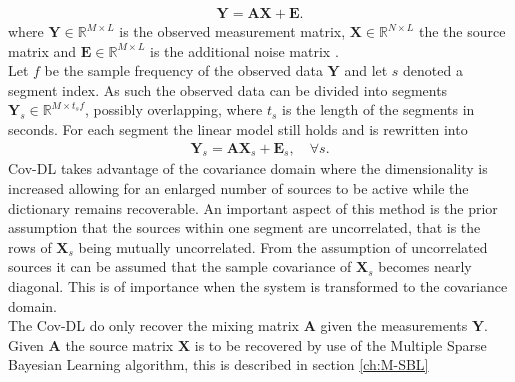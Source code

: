 \begin{align*}
\mathbf{Y} = \mathbf{AX}+\textbf{E}.
\end{align*}
where $\mathbf{Y} \in \mathbb{R}^{M \times L}$ is the observed  measurement matrix, $\mathbf{X} \in \mathbb{R}^{N \times L}$ the the source matrix and $\mathbf{E} \in \mathbb{R}^{M \times L}$ is the additional noise matrix .
\\
Let $f$ be the sample frequency of the observed data $\mathbf{Y}$ and let $s$ denoted a segment index. As such the observed data can be divided into segments $\mathbf{Y}_s \in \mathbb{R}^{M \times t_s f}$, possibly overlapping, where $t_s$ is the length of the segments in seconds. For each segment the linear model still holds and is rewritten into
\begin{align*}
\mathbf{Y}_s = \mathbf{AX}_s + \textbf{E}_s, \quad \forall s.
\end{align*}
Cov-DL takes advantage of the covariance domain where the dimensionality is increased allowing for an enlarged number of sources to be active while the dictionary remains recoverable.  
An important aspect of this method is the prior assumption that the sources within one segment are uncorrelated, that is the rows of $\textbf{X}_s$ being mutually uncorrelated. 
From the assumption of uncorrelated sources it can be assumed that the sample covariance of $\textbf{X}_s$ becomes nearly diagonal. This is of importance when the system is transformed to the covariance domain.    
\\
The Cov-DL do only recover the mixing matrix $\mathbf{A}$ given the measurements $\textbf{Y}$. Given $\textbf{A}$ the source matrix $\mathbf{X}$ is to be recovered by use of the Multiple Sparse Bayesian Learning algorithm, this is described in section \ref{ch:M-SBL} 


